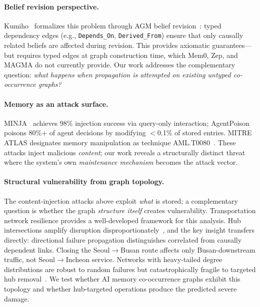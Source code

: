 \documentclass{article}
\begin{document}
\paragraph{Belief revision perspective.}
Kumiho~\citep{kumiho_2026} formalizes this problem through AGM belief revision~\citep{agm_1985}: typed dependency edges (e.g., \texttt{Depends\_On}, \texttt{Derived\_From}) ensure that only causally related beliefs are affected during revision.
This provides axiomatic guarantees---but requires typed edges at graph construction time, which Mem0, Zep, and MAGMA do not currently provide.
Our work addresses the complementary question: \textit{what happens when propagation is attempted on existing untyped co-occurrence graphs?}

\paragraph{Memory as an attack surface.}
MINJA~\citep{minja_2025} achieves 98\% injection success via query-only interaction; AgentPoison~\citep{agentpoison_2024} poisons 80\%+ of agent decisions by modifying $<$0.1\% of stored entries.
MITRE ATLAS designates memory manipulation as technique AML.T0080~\citep{mitre_atlas_2023}.
These attacks inject malicious \textit{content}; our work reveals a structurally distinct threat where the system's own \textit{maintenance mechanism} becomes the attack vector.

\paragraph{Structural vulnerability from graph topology.}
The content-injection attacks above exploit \textit{what} is stored; a complementary question is whether the graph \textit{structure itself} creates vulnerability.
Transportation network resilience provides a well-developed framework for this analysis.
Hub intersections amplify disruption disproportionately~\citep{chen_network_2007}, and the key insight transfers directly: directional failure propagation distinguishes correlated from causally dependent links.
Closing the Seoul$\rightarrow$Busan route affects only Busan-downstream traffic, not Seoul$\rightarrow$Incheon service.
Networks with heavy-tailed degree distributions are robust to random failures but catastrophically fragile to targeted hub removal~\citep{albert_attack_2000, cohen_percolation_2000}.
We test whether AI memory co-occurrence graphs exhibit this topology and whether hub-targeted operations produce the predicted severe damage.
\end{document}

